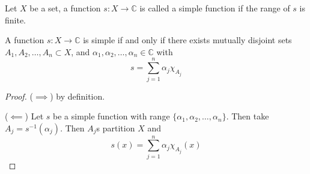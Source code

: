 \begin{definition}
   Let $X$ be a set, a function $s: X \to \mathbb{C}$ is called a simple function if the range of $s$ is finite.
\end{definition}
\begin{proposition}
   A function $s: X \to \mathbb{C}$ is simple if and only if there exists mutually disjoint sets $A_1, A_2, \ldots , A_n \subset X$, and $ \alpha_1, \alpha_2, \ldots , \alpha_n \in \mathbb{C}$ with \[
        s = \sum_{j = 1}^{n} \alpha_j \chi_{A_j}
   \]
\end{proposition}
\begin{proof}
  ($\implies$) by definition.

  ($\impliedby$) Let $s$ be a simple function with range $ \{ \alpha_1, \alpha_2, \ldots , \alpha_n \}$. Then take $A_j = s^{-1}(\alpha_j)$. Then $A_j$s partition $X$ and \[
    s(x) = \sum_{ j = 1}^{n} \alpha_j \chi_{A_j}(x)
  \]
\end{proof}
